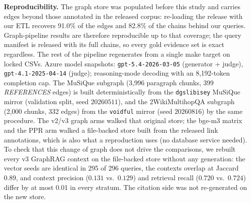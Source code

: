 \textbf{Reproducibility.} The graph store was populated before this
study and carries edges beyond those annotated in the released corpus:
re-loading the release with our ETL recovers 91.0\% of the edges and
82.8\% of the chains behind our queries. Graph-pipeline results are
therefore reproducible up to that coverage; the query manifest is
released with its full chains, so every gold evidence set is exact
regardless. The rest of the pipeline regenerates from a
single make target on locked CSVs. Azure model snapshots:
\texttt{gpt-5.4-}\allowbreak\texttt{2026-03-05} (generator + judge),
\texttt{gpt-4.1-2025-04-14} (judge); reasoning-mode decoding with an
8{,}192-token completion cap. The MuSiQue
subgraph (3{,}996 paragraph chunks, 399 \textit{REFERENCES} edges) is
built deterministically from the \texttt{dgslibisey}
MuSiQue mirror (validation split, seed $20260511$), and the
2WikiMultihopQA subgraph (2{,}000 chunks, 332 edges) from the
\texttt{voidful} mirror (seed $20260816$) by the same procedure.
The v2/v3 graph arms walked that original store; the bge-m3 matrix and
the PPR arm walked a file-backed store built from the released link
annotations, which is also what a reproduction uses (no database service
needed). To check that this change of graph does not drive the
comparisons, we rebuilt every v3 GraphRAG context on the file-backed
store without any generation: the vector seeds are identical in 295 of
296 queries, the contexts overlap at Jaccard 0.89, and context
precision ($0.131$ vs.\ $0.129$) and retrieval recall ($0.720$ vs.\
$0.724$) differ by at most 0.01 in every stratum. The citation side was not
re-generated on the new store.
